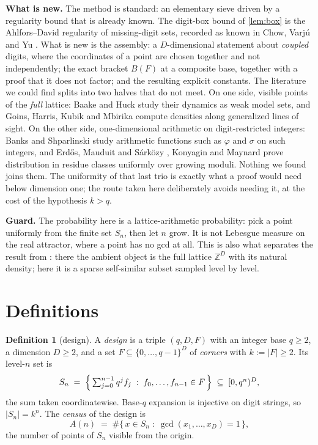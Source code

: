 \documentclass[11pt]{amsart}
\theoremstyle{definition}
\newtheorem{definition}[theorem]{Definition}
\theoremstyle{remark}
\begin{document}
\medskip
\noindent\textbf{What is new.} The method is standard: an elementary sieve driven by a regularity bound that is already known. The digit-box bound of \cref{lem:box} is the Ahlfors--David regularity of missing-digit sets, recorded as known in Chow, Varj\'u and Yu \cite{cvy}. What is new is the assembly: a $D$-dimensional statement about \emph{coupled} digits, where the coordinates of a point are chosen together and not independently; the exact bracket $B(F)$ at a composite base, together with a proof that it does not factor; and the resulting explicit constants. The literature we could find splits into two halves that do not meet. On one side, visible points of the \emph{full} lattice: Baake and Huck \cite{bh} study their dynamics as weak model sets, and Goins, Harris, Kubik and Mbirika \cite{ghkm} compute densities along generalized lines of sight. On the other side, one-dimensional arithmetic on digit-restricted integers: Banks and Shparlinski \cite{bs} study arithmetic functions such as $\varphi$ and $\sigma$ on such integers, and Erd\H{o}s, Mauduit and S\'ark\"ozy \cite{ems}, Konyagin \cite{kon} and Maynard \cite{may} prove distribution in residue classes uniformly over growing moduli. Nothing we found joins them. The uniformity of that last trio is exactly what a proof would need below dimension one; the route taken here deliberately avoids needing it, at the cost of the hypothesis $k>q$.

\medskip
\noindent\textbf{Guard.} The probability here is a lattice-arithmetic probability: pick a point uniformly from the finite set $S_n$, then let $n$ grow. It is not Lebesgue measure on the real attractor, where a point has no gcd at all. This is also what separates the result from \cite{bh}: there the ambient object is the full lattice $\mathbb{Z}^D$ with its natural density; here it is a sparse self-similar subset sampled level by level.

\section{Definitions}
\label{sec:defs}

\begin{definition}[design]
\label{def:design}
A \emph{design} is a triple $(q,D,F)$ with an integer base $q \ge 2$, a dimension $D \ge 2$, and a set $F \subseteq \{0,\dots,q-1\}^D$ of \emph{corners} with $k := |F| \ge 2$. Its level-$n$ set is
\[
  S_n \;=\; \Bigl\{\, \textstyle\sum_{j=0}^{n-1} q^{j} f_j \;:\; f_0,\dots,f_{n-1} \in F \,\Bigr\} \;\subseteq\; [0,q^{n})^{D},
\]
the sum taken coordinatewise. Base-$q$ expansion is injective on digit strings, so $|S_n| = k^n$. The \emph{census} of the design is
\[
  A(n) \;=\; \#\{\, x \in S_n \;:\; \gcd(x_1,\dots,x_D)=1 \,\},
\]
the number of points of $S_n$ visible from the origin.
\end{definition}
\end{document}

